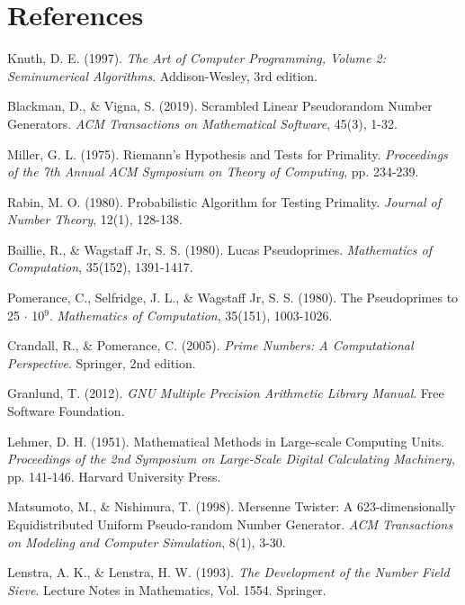 \section{References}


\begin{thebibliography}{99}

 Knuth, D. E. (1997). \textit{The Art of Computer Programming, Volume 2: Seminumerical Algorithms}. Addison-Wesley, 3rd edition.

 Blackman, D., \& Vigna, S. (2019). Scrambled Linear Pseudorandom Number Generators. \textit{ACM Transactions on Mathematical Software}, 45(3), 1-32.

 Miller, G. L. (1975). Riemann's Hypothesis and Tests for Primality. \textit{Proceedings of the 7th Annual ACM Symposium on Theory of Computing}, pp. 234-239.

 Rabin, M. O. (1980). Probabilistic Algorithm for Testing Primality. \textit{Journal of Number Theory}, 12(1), 128-138.

 Baillie, R., \& Wagstaff Jr, S. S. (1980). Lucas Pseudoprimes. \textit{Mathematics of Computation}, 35(152), 1391-1417.

 Pomerance, C., Selfridge, J. L., \& Wagstaff Jr, S. S. (1980). The Pseudoprimes to 25 $\cdot$ 10$^9$. \textit{Mathematics of Computation}, 35(151), 1003-1026.

 Crandall, R., \& Pomerance, C. (2005). \textit{Prime Numbers: A Computational Perspective}. Springer, 2nd edition.

 Granlund, T. (2012). \textit{GNU Multiple Precision Arithmetic Library Manual}. Free Software Foundation.

 Lehmer, D. H. (1951). Mathematical Methods in Large-scale Computing Units. \textit{Proceedings of the 2nd Symposium on Large-Scale Digital Calculating Machinery}, pp. 141-146. Harvard University Press.

 Matsumoto, M., \& Nishimura, T. (1998). Mersenne Twister: A 623-dimensionally Equidistributed Uniform Pseudo-random Number Generator. \textit{ACM Transactions on Modeling and Computer Simulation}, 8(1), 3-30.

 Lenstra, A. K., \& Lenstra, H. W. (1993). \textit{The Development of the Number Field Sieve}. Lecture Notes in Mathematics, Vol. 1554. Springer.


\end{thebibliography}
